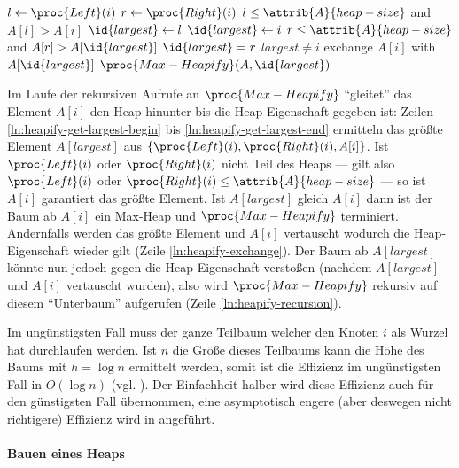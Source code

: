 \begin{codebox}
    \li $l \gets \proc{Left}(i)$\label{ln:heapify-get-largest-begin}
    \li $r \gets \proc{Right}(i)$
    \li \If $l \leq \attrib{A}{heap-size}$ and $A[l] > A[i]$
    \li      \Then
                $\id{largest} \gets l$
    \li     \Else
                $\id{largest} \gets i$
            \End
    \li \If $r \leq \attrib{A}{heap-size}$ and $A[r] > A[\id{largest}]$
    \li     \Then
                $\id{largest} = r$
            \End\label{ln:heapify-get-largest-end}
    \li \If $largest \neq i$ \label{ln:heapify-largest}
    \li     \Then
                exchange $A[i]$ with $A[\id{largest}]$\label{ln:heapify-exchange}
    \li         $\proc{Max-Heapify}(A, \id{largest})$\label{ln:heapify-recursion}
            \End
\end{codebox}

Im Laufe der rekursiven Aufrufe an $\proc{Max-Heapify}$ \enquote{gleitet} das Element $A[i]$ den Heap hinunter bis die Heap-Eigenschaft gegeben ist: Zeilen \ref{ln:heapify-get-largest-begin} bis \ref{ln:heapify-get-largest-end} ermitteln das größte Element $A[largest]$ aus $\{\proc{Left}(i), \proc{Right}(i), A[i]\}$. Ist $\proc{Left}(i)$ oder $\proc{Right}(i)$ nicht Teil des Heaps --- gilt also $\proc{Left}(i)$ oder $\proc{Right}(i) \leq \attrib{A}{heap-size}$ --- so ist $A[i]$ garantiert das größte Element. Ist $A[largest]$ gleich $A[i]$ dann ist der Baum ab $A[i]$ ein Max-Heap und $\proc{Max-Heapify}$ terminiert. Andernfalls werden das größte Element und $A[i]$ vertauscht wodurch die Heap-Eigenschaft wieder gilt (Zeile \ref{ln:heapify-exchange}). Der Baum ab $A[largest]$ könnte nun jedoch gegen die Heap-Eigenschaft verstoßen (nachdem $A[largest]$ und $A[i]$ vertauscht wurden), also wird $\proc{Max-Heapify}$ rekursiv auf diesem \enquote{Unterbaum} aufgerufen (Zeile \ref{ln:heapify-recursion}).

Im ungünstigsten Fall muss der ganze Teilbaum welcher den Knoten $i$ als Wurzel hat durchlaufen werden. Ist $n$ die Größe dieses Teilbaums kann die Höhe des Baums mit $h = \log n$ ermittelt werden, somit ist die Effizienz im ungünstigsten Fall in $O(\log n)$ (vgl. \cite[155]{clrs2001}). Der Einfachheit halber wird diese Effizienz auch für den günstigsten Fall übernommen, eine asymptotisch engere (aber deswegen nicht richtigere) Effizienz wird in \cite{bff1996} angeführt.

\paragraph{Bauen eines Heaps}

